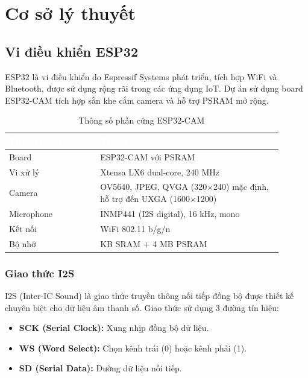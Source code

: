 \chapter{Cơ sở lý thuyết}

\section{Vi điều khiển ESP32}

ESP32 là vi điều khiển do Espressif Systems phát triển, tích hợp WiFi và
Bluetooth, được sử dụng rộng rãi trong các ứng dụng IoT. Dự án sử dụng
board ESP32-CAM tích hợp sẵn khe cắm camera và hỗ trợ PSRAM mở rộng.

\begin{table}[htbp]
\centering
\caption{Thông số phần cứng ESP32-CAM}
\label{tab:esp32-hardware}
\begin{tabular}{>{\raggedright\arraybackslash}p{0.3\linewidth} >{\raggedright\arraybackslash}p{0.6\linewidth}}
\toprule
\rowcolor{headerblue} \textcolor{white}{\textbf{Thành phần}} & \textcolor{white}{\textbf{Thông số}} \\
\midrule
\rowcolor{rowgray} Board & ESP32-CAM với PSRAM \\
Vi xử lý & Xtensa LX6 dual-core, 240 MHz \\
\rowcolor{rowgray} Camera & OV5640, JPEG, QVGA (320$\times$240) mặc định, hỗ trợ đến UXGA (1600$\times$1200) \\
Microphone & INMP441 (I2S digital), 16 kHz, mono \\
\rowcolor{rowgray} Kết nối & WiFi 802.11 b/g/n \\
Bộ nhớ & 520 KB SRAM + 4 MB PSRAM \\
\bottomrule
\end{tabular}
\end{table}

\subsection{Giao thức I2S}

I2S (Inter-IC Sound) là giao thức truyền thông nối tiếp đồng bộ được thiết kế
chuyên biệt cho dữ liệu âm thanh số. Giao thức sử dụng 3 đường tín hiệu:

\begin{itemize}
\item \textbf{SCK (Serial Clock):} Xung nhịp đồng bộ dữ liệu.
\item \textbf{WS (Word Select):} Chọn kênh trái (0) hoặc kênh phải (1).
\item \textbf{SD (Serial Data):} Đường dữ liệu nối tiếp.
\end{itemize}


